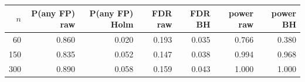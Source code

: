 \begin{tabular}{rrrrrrr}\toprule
$n$ & P(any FP) raw & P(any FP) Holm & FDR raw & FDR BH & power raw & power BH\\\midrule
60 & 0.860 & 0.020 & 0.193 & 0.035 & 0.766 & 0.380\\
150 & 0.835 & 0.052 & 0.147 & 0.038 & 0.994 & 0.968\\
300 & 0.890 & 0.058 & 0.159 & 0.043 & 1.000 & 1.000\\
\bottomrule\end{tabular}
